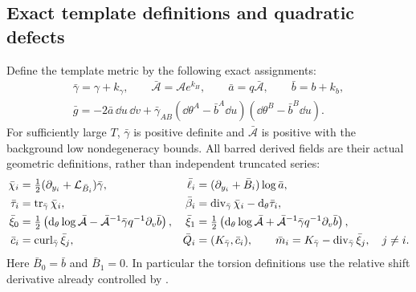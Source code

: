 \subsection{Exact template definitions and quadratic defects}

Define the template metric by the following exact assignments:
\begin{equation}\label{pk:template}
 \begin{gathered}
 \bar\gamma=\gamma+k_\gamma,\qquad
 \bar{\mathcal A}=\mathcal A e^{k_H},\qquad
 \bar a=q\bar{\mathcal A},\qquad \bar b=b+k_b,\\
 \bar g=-2\bar a\,\dd u\,\dd v+
 \bar\gamma_{AB}(\dd\theta^A-\bar b^A\dd u)
                         (\dd\theta^B-\bar b^B\dd u).
 \end{gathered}
\end{equation}
For sufficiently large $T$, $\bar\gamma$ is positive definite
and $\bar{\mathcal A}$ is positive with the background low
nondegeneracy bounds. All barred derived fields are their actual
geometric definitions, rather than independent truncated series:
\begin{equation}\label{pk:template-derived}
 \begin{aligned}
 \bar\chi_i&=\tfrac12(\partial_{y_i}+\mathcal L_{\bar B_i})\bar\gamma,
 &\bar\ell_i&=(\partial_{y_i}+\bar B_i)\log\bar a,\\
 \bar\tau_i&=\operatorname{tr}_{\bar\gamma}\bar\chi_i,
 &\bar\beta_i&=\operatorname{div}_{\bar\gamma}\bar\chi_i-\mathrm d_\theta\bar\tau_i,\\
 \bar\xi_0&=\tfrac12\left(\mathrm d_\theta\log\bar{\mathcal A}
       -\bar{\mathcal A}^{-1}\bar\gamma
                                      q^{-1}\partial_v\bar b\right),
 &\bar\xi_1&=\tfrac12\left(\mathrm d_\theta\log\bar{\mathcal A}
       +\bar{\mathcal A}^{-1}\bar\gamma
                                      q^{-1}\partial_v\bar b\right),\\
 \bar c_i&=\operatorname{curl}_{\bar\gamma}\bar\xi_j,
 &\bar Q_i&=(K_{\bar\gamma},\bar c_i),\qquad
 \bar m_i=K_{\bar\gamma}-\operatorname{div}_{\bar\gamma}\bar\xi_j,\quad j\ne i.
 \end{aligned}
\end{equation}
Here $\bar B_0=\bar b$ and $\bar B_1=0$. In particular the torsion
definitions use the relative shift derivative already controlled
by .

